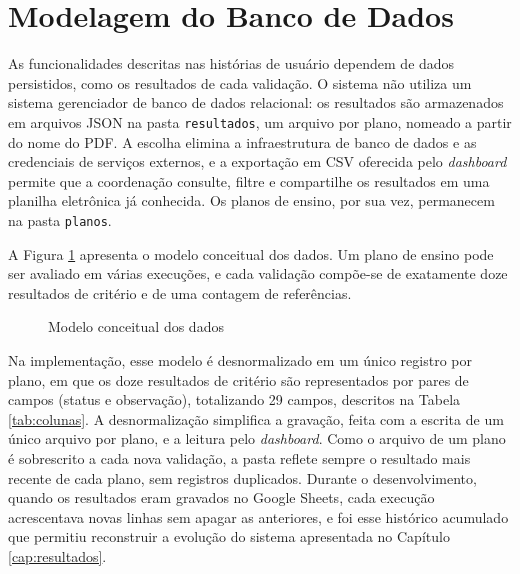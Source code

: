 \section{Modelagem do Banco de Dados}
\label{sec:bd}

As funcionalidades descritas nas histórias de usuário dependem de dados persistidos, como os resultados de cada validação. O sistema não utiliza um sistema gerenciador de banco de dados relacional: os resultados são armazenados em arquivos JSON na pasta \texttt{resultados}, um arquivo por plano, nomeado a partir do nome do PDF. A escolha elimina a infraestrutura de banco de dados e as credenciais de serviços externos, e a exportação em CSV oferecida pelo \textit{dashboard} permite que a coordenação consulte, filtre e compartilhe os resultados em uma planilha eletrônica já conhecida. Os planos de ensino, por sua vez, permanecem na pasta \texttt{planos}.

A Figura \ref{fig:dados} apresenta o modelo conceitual dos dados. Um plano de ensino pode ser avaliado em várias execuções, e cada validação compõe-se de exatamente doze resultados de critério e de uma contagem de referências.

\begin{figure}[htbp]
\centering
\caption{Modelo conceitual dos dados}
\label{fig:dados}

\end{figure}

Na implementação, esse modelo é desnormalizado em um único registro por plano, em que os doze resultados de critério são representados por pares de campos (status e observação), totalizando 29 campos, descritos na Tabela \ref{tab:colunas}. A desnormalização simplifica a gravação, feita com a escrita de um único arquivo por plano, e a leitura pelo \textit{dashboard}. Como o arquivo de um plano é sobrescrito a cada nova validação, a pasta reflete sempre o resultado mais recente de cada plano, sem registros duplicados. Durante o desenvolvimento, quando os resultados eram gravados no Google Sheets, cada execução acrescentava novas linhas sem apagar as anteriores, e foi esse histórico acumulado que permitiu reconstruir a evolução do sistema apresentada no Capítulo \ref{cap:resultados}.


